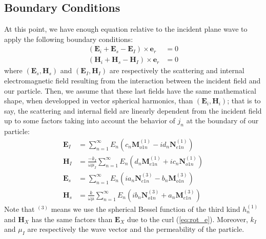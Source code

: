 \documentclass{article}
\numberwithin{equation}{section}
\begin{document}
\subsection{Boundary Conditions}

At this point, we have enough equation relative to the incident plane wave to apply the following boundary conditions:
\begin{align}\label{eq:boundaries}
(\textbf{E}_{i} + \textbf{E}_{s} - \textbf{E}_{I}) \times \textbf{e}_{r} &= 0\\
(\textbf{H}_{i} + \textbf{H}_{s} - \textbf{H}_{I}) \times \textbf{e}_{r} &= 0
\end{align}
where $(\textbf{E}_{s}, \textbf{H}_{s})$ and $(\textbf{E}_{I}, \textbf{H}_{I})$ are respectively the scattering and internal electromagnetic field resulting from the interaction between the incident field and our particle. Then, we assume that these last fields have the same mathematical shape, when developped in vector spherical harmonics, than $(\textbf{E}_{i}, \textbf{H}_{i})$; that is to say, the scattering and internal field are linearly dependent from the incident field up to some factors taking into account the behavior of $j_{n}$ at the boundary of our particle:
\begin{align}
\textbf{E}_{I}&=\sum_{n=1}^{\infty }E_{n}(c_{n}\textbf{M}^{(1)}_{o1n} - id_{n}\textbf{N}^{(1)}_{e1n})\\
\textbf{H}_{I}&=\frac{-k_{I}}{\omega\mu_{I}}\sum_{n=1}^{\infty }E_{n}(d_{n}\textbf{M}^{(1)}_{e1n} + ic_{n}\textbf{N}^{(1)}_{o1n})\\
\textbf{E}_{s}&=\sum_{n=1}^{\infty }E_{n}(ia_{n}\textbf{N}^{(3)}_{e1n} - b_{n}\textbf{M}^{(3)}_{o1n})\\
\textbf{H}_{s}&=\frac{k}{\omega\mu}\sum_{n=1}^{\infty }E_{n}(ib_{n}\textbf{N}^{(3)}_{o1n} + a_{n}\textbf{M}^{(3)}_{e1n})
\end{align}
Note that $^{(3)}$ means we use the spherical Bessel function of the third kind $h^{(1)}_{n}$ and $\textbf{H}_{X}$ has the same factors than $\textbf{E}_{X}$ due to the curl (\ref{eq:rot_e}). Moreover, $k_{I}$ and $\mu_{I}$ are respectively the wave vector and the permeability of the particle.
\end{document}
